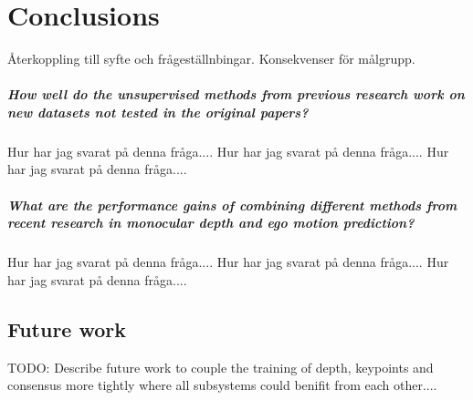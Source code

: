 \chapter{Conclusions}\label{cha:conclusions}

Återkoppling till syfte och frågeställnbingar. Konsekvenser för målgrupp.

\paragraph{\textbf{How well do the unsupervised methods from previous research work on new datasets not tested in the original papers?}} Hur har jag svarat på denna fråga.... Hur har jag svarat på denna fråga.... Hur har jag svarat på denna fråga....

\paragraph{\textbf{What are the performance gains of combining different methods from recent research in monocular depth and ego motion prediction?}} Hur har jag svarat på denna fråga.... Hur har jag svarat på denna fråga.... Hur har jag svarat på denna fråga....

\section{Future work}

TODO: Describe future work to couple the training of depth, keypoints and consensus more tightly where all subsystems could benifit from each other....